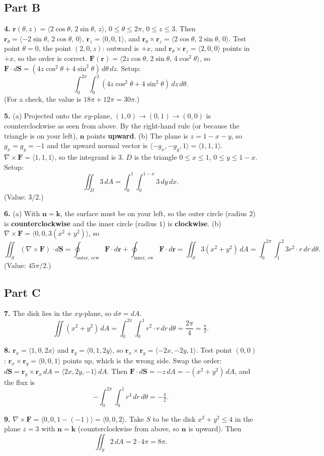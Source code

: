 \documentclass[11pt]{article}
\newcommand{\bF}{\mathbf{F}}
\newcommand{\br}{\mathbf{r}}
\newcommand{\bn}{\mathbf{n}}
\newcommand{\bk}{\mathbf{k}}
\newcommand{\curl}{\nabla\times}
\newcommand{\dA}{\,dA}
\begin{document}
\subsection*{Part B}

\textbf{4.} $\br(\theta,z)=\langle2\cos\theta,\,2\sin\theta,\,z\rangle$, $0\le\theta\le2\pi$, $0\le z\le3$. Then $\br_\theta=\langle-2\sin\theta,\,2\cos\theta,\,0\rangle$, $\br_z=\langle0,0,1\rangle$, and $\br_\theta\times\br_z=\langle2\cos\theta,\,2\sin\theta,\,0\rangle$. Test point $\theta=0$, the point $(2,0,z)$: outward is $+x$, and $\br_\theta\times\br_z=\langle2,0,0\rangle$ points in $+x$, so the order is correct. $\bF(\br)=\langle2z\cos\theta,\,2\sin\theta,\,4\cos^2\theta\rangle$, so $\bF\cdot d\mathbf{S}=(4z\cos^2\theta+4\sin^2\theta)\,d\theta\,dz$. Setup:
\[
  \int_0^{2\pi}\!\!\int_0^3(4z\cos^2\theta+4\sin^2\theta)\,dz\,d\theta .
\]
(For a check, the value is $18\pi+12\pi=30\pi$.)

\textbf{5.} (a) Projected onto the $xy$-plane, $(1,0)\to(0,1)\to(0,0)$ is counterclockwise as seen from above. By the right-hand rule (or because the triangle is on your left), $\bn$ points \textbf{upward}. (b) The plane is $z=1-x-y$, so $g_x=g_y=-1$ and the upward normal vector is $\langle-g_x,-g_y,1\rangle=\langle1,1,1\rangle$. $\curl\bF=\langle1,1,1\rangle$, so the integrand is $3$. $D$ is the triangle $0\le x\le1$, $0\le y\le1-x$. Setup:
\[
  \iint_D 3\dA=\int_0^1\!\!\int_0^{1-x}3\,dy\,dx .
\]
(Value: $3/2$.)

\textbf{6.} (a) With $\bn=\bk$, the surface must be on your left, so the outer circle (radius $2$) is \textbf{counterclockwise} and the inner circle (radius $1$) is \textbf{clockwise}. (b) $\curl\bF=\langle0,0,3(x^2+y^2)\rangle$, so
\[
  \iint_S(\curl\bF)\cdot d\mathbf{S}=\oint_{\text{outer, ccw}}\bF\cdot d\br+\oint_{\text{inner, cw}}\bF\cdot d\br
  =\iint_S3(x^2+y^2)\dA=\int_0^{2\pi}\!\!\int_1^2 3r^2\cdot r\,dr\,d\theta .
\]
(Value: $45\pi/2$.)

\subsection*{Part C}

\textbf{7.} The disk lies in the $xy$-plane, so $d\sigma=dA$.
\[
  \iint(x^2+y^2)\dA=\int_0^{2\pi}\!\!\int_0^1r^2\cdot r\,dr\,d\theta=\frac{2\pi}{4}=\boxed{\tfrac{\pi}{2}} .
\]

\textbf{8.} $\br_x=\langle1,0,2x\rangle$ and $\br_y=\langle0,1,2y\rangle$, so $\br_x\times\br_y=\langle-2x,-2y,1\rangle$. Test point $(0,0)$: $\br_x\times\br_y=\langle0,0,1\rangle$ points up, which is the wrong side. Swap the order: $d\mathbf{S}=\br_y\times\br_x\dA=\langle2x,2y,-1\rangle\dA$. Then $\bF\cdot d\mathbf{S}=-z\dA=-(x^2+y^2)\dA$, and the flux is
\[
  -\int_0^{2\pi}\!\!\int_0^1r^3\,dr\,d\theta=\boxed{-\tfrac{\pi}{2}} .
\]

\textbf{9.} $\curl\bF=\langle0,0,1-(-1)\rangle=\langle0,0,2\rangle$. Take $S$ to be the disk $x^2+y^2\le4$ in the plane $z=3$ with $\bn=\bk$ (counterclockwise from above, so $\bn$ is upward). Then
\[
  \iint_S 2\dA=2\cdot4\pi=\boxed{8\pi} .
\]
\end{document}
